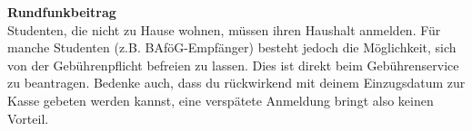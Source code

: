 \begin{multicols}{2}




% 


\textbf{Rundfunkbeitrag} \\
Studenten, die nicht zu Hause wohnen, müssen ihren Haushalt anmelden.
Für manche Studenten (z.B. BAföG-Empfänger) besteht jedoch die Möglichkeit, sich von der Gebührenpflicht befreien zu lassen.
Dies ist direkt beim Gebührenservice zu beantragen.
Bedenke auch, dass du rückwirkend mit deinem Einzugsdatum zur Kasse gebeten werden kannst, eine verspätete Anmeldung bringt also keinen Vorteil.


% 


\end{multicols}
